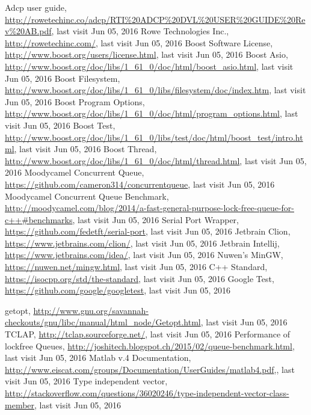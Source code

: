 \begin{thebibliography}{99}

Adcp user guide, \url{http://rowetechinc.co/adcp/RTI%20ADCP%20DVL%20USER%20GUIDE%20Rev%20AB.pdf}, last visit Jun 05, 2016
Rowe Technologies Inc., \url{http://rowetechinc.com/}, last visit Jun 05, 2016
 Boost Software License, \url{http://www.boost.org/users/license.html}, last visit Jun 05, 2016
 Boost Asio, \url{http://www.boost.org/doc/libs/1\_61\_0/doc/html/boost\_asio.html}, last visit Jun 05, 2016
 Boost Filesystem, \url{http://www.boost.org/doc/libs/1\_61\_0/libs/filesystem/doc/index.htm}, last visit Jun 05, 2016
 Boost Program Options, \url{http://www.boost.org/doc/libs/1\_61\_0/doc/html/program\_options.html}, last visit Jun 05, 2016
 Boost Test, \url{http://www.boost.org/doc/libs/1\_61\_0/libs/test/doc/html/boost\_test/intro.html}, last visit Jun 05, 2016
 Boost Thread, \url{http://www.boost.org/doc/libs/1\_61\_0/doc/html/thread.html}, last visit Jun 05, 2016
 Moodycamel Concurrent Queue, \url{https://github.com/cameron314/concurrentqueue}, last visit Jun 05, 2016
 Moodycamel Concurrent Queue Benchmark, \url{http://moodycamel.com/blog/2014/a-fast-general-purpose-lock-free-queue-for-c++#benchmarks}, last visit Jun 05, 2016
Serial Port Wrapper, \url{https://github.com/fedetft/serial-port}, last visit Jun 05, 2016
Jetbrain Clion, \url{https://www.jetbrains.com/clion/}, last visit Jun 05, 2016
 Jetbrain Intellij, \url{https://www.jetbrains.com/idea/}, last visit Jun 05, 2016
Nuwen's MinGW, \url{https://nuwen.net/mingw.html}, last visit Jun 05, 2016
C++ Standard, \url{https://isocpp.org/std/the-standard}, last visit Jun 05, 2016
Google Test, \url{https://github.com/google/googletest}, last visit Jun 05, 2016

getopt, \url{http://www.gnu.org/savannah-checkouts/gnu/libc/manual/html_node/Getopt.html}, last visit Jun 05, 2016
TCLAP, \url{http://tclap.sourceforge.net/}, last visit Jun 05, 2016
 Performance of lockfree Queues, \url{http://joshitech.blogspot.ch/2015/02/queue-benchmark.html}, last visit Jun 05, 2016
 Matlab v.4 Documentation, \url{http://www.eiscat.com/groups/Documentation/UserGuides/matlab4.pdf},, last visit Jun 05, 2016
 Type independent vector, \url{http://stackoverflow.com/questions/36020246/type-independent-vector-class-member}, last visit Jun 05, 2016

\end{thebibliography}

